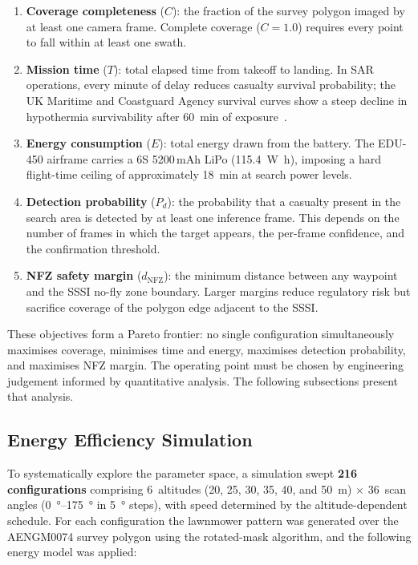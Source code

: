 \begin{enumerate}
  \item \textbf{Coverage completeness} ($C$): the fraction of the survey polygon imaged by at least one camera frame. Complete coverage ($C = 1.0$) requires every point to fall within at least one swath.
  \item \textbf{Mission time} ($T$): total elapsed time from takeoff to landing. In SAR operations, every minute of delay reduces casualty survival probability; the UK Maritime and Coastguard Agency survival curves show a steep decline in hypothermia survivability after \SI{60}{\minute} of exposure~\cite{golden2006hypothermia}.
  \item \textbf{Energy consumption} ($E$): total energy drawn from the battery. The EDU-450 airframe carries a 6S 5200\,mAh LiPo (\SI{115.4}{\watt\hour}), imposing a hard flight-time ceiling of approximately \SI{18}{\minute} at search power levels.
  \item \textbf{Detection probability} ($P_d$): the probability that a casualty present in the search area is detected by at least one inference frame. This depends on the number of frames in which the target appears, the per-frame confidence, and the confirmation threshold.
  \item \textbf{NFZ safety margin} ($d_{\text{NFZ}}$): the minimum distance between any waypoint and the SSSI no-fly zone boundary. Larger margins reduce regulatory risk but sacrifice coverage of the polygon edge adjacent to the SSSI.
\end{enumerate}

These objectives form a Pareto frontier: no single configuration simultaneously maximises coverage, minimises time and energy, maximises detection probability, and maximises NFZ margin. The operating point must be chosen by engineering judgement informed by quantitative analysis. The following subsections present that analysis.

\subsection{Energy Efficiency Simulation}\label{sec:energy-sim-old}

To systematically explore the parameter space, a simulation swept \textbf{216 configurations} comprising 6~altitudes (20, 25, 30, 35, 40, and \SI{50}{\metre}) $\times$ 36~scan angles (\SIrange{0}{175}{\degree} in \SI{5}{\degree} steps), with speed determined by the altitude-dependent schedule. For each configuration the lawnmower pattern was generated over the AENGM0074 survey polygon using the rotated-mask algorithm, and the following energy model was applied:

